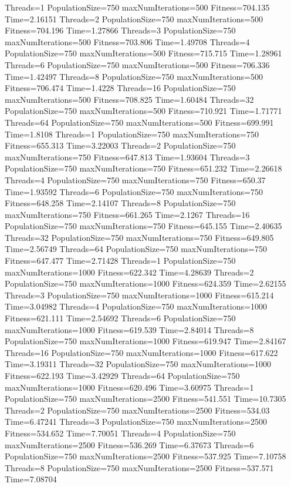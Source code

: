 \documentclass[10pt,letterpaper]{article}
\begin{document}
Threads=1 PopulationSize=750 maxNumIterations=500 Fitness=704.135 Time=2.16151
Threads=2 PopulationSize=750 maxNumIterations=500 Fitness=704.196 Time=1.27866
Threads=3 PopulationSize=750 maxNumIterations=500 Fitness=703.806 Time=1.49708
Threads=4 PopulationSize=750 maxNumIterations=500 Fitness=715.715 Time=1.28961
Threads=6 PopulationSize=750 maxNumIterations=500 Fitness=706.336 Time=1.42497
Threads=8 PopulationSize=750 maxNumIterations=500 Fitness=706.474 Time=1.4228
Threads=16 PopulationSize=750 maxNumIterations=500 Fitness=708.825 Time=1.60484
Threads=32 PopulationSize=750 maxNumIterations=500 Fitness=710.921 Time=1.71771
Threads=64 PopulationSize=750 maxNumIterations=500 Fitness=699.991 Time=1.8108
Threads=1 PopulationSize=750 maxNumIterations=750 Fitness=655.313 Time=3.22003
Threads=2 PopulationSize=750 maxNumIterations=750 Fitness=647.813 Time=1.93604
Threads=3 PopulationSize=750 maxNumIterations=750 Fitness=651.232 Time=2.26618
Threads=4 PopulationSize=750 maxNumIterations=750 Fitness=650.37 Time=1.93592
Threads=6 PopulationSize=750 maxNumIterations=750 Fitness=648.258 Time=2.14107
Threads=8 PopulationSize=750 maxNumIterations=750 Fitness=661.265 Time=2.1267
Threads=16 PopulationSize=750 maxNumIterations=750 Fitness=645.155 Time=2.40635
Threads=32 PopulationSize=750 maxNumIterations=750 Fitness=649.805 Time=2.56749
Threads=64 PopulationSize=750 maxNumIterations=750 Fitness=647.477 Time=2.71428
Threads=1 PopulationSize=750 maxNumIterations=1000 Fitness=622.342 Time=4.28639
Threads=2 PopulationSize=750 maxNumIterations=1000 Fitness=624.359 Time=2.62155
Threads=3 PopulationSize=750 maxNumIterations=1000 Fitness=615.214 Time=3.04982
Threads=4 PopulationSize=750 maxNumIterations=1000 Fitness=621.111 Time=2.54692
Threads=6 PopulationSize=750 maxNumIterations=1000 Fitness=619.539 Time=2.84014
Threads=8 PopulationSize=750 maxNumIterations=1000 Fitness=619.947 Time=2.84167
Threads=16 PopulationSize=750 maxNumIterations=1000 Fitness=617.622 Time=3.19311
Threads=32 PopulationSize=750 maxNumIterations=1000 Fitness=622.193 Time=3.42929
Threads=64 PopulationSize=750 maxNumIterations=1000 Fitness=620.496 Time=3.60975
Threads=1 PopulationSize=750 maxNumIterations=2500 Fitness=541.551 Time=10.7305
Threads=2 PopulationSize=750 maxNumIterations=2500 Fitness=534.03 Time=6.47241
Threads=3 PopulationSize=750 maxNumIterations=2500 Fitness=534.652 Time=7.70051
Threads=4 PopulationSize=750 maxNumIterations=2500 Fitness=536.269 Time=6.37673
Threads=6 PopulationSize=750 maxNumIterations=2500 Fitness=537.925 Time=7.10758
Threads=8 PopulationSize=750 maxNumIterations=2500 Fitness=537.571 Time=7.08704
\end{document}

